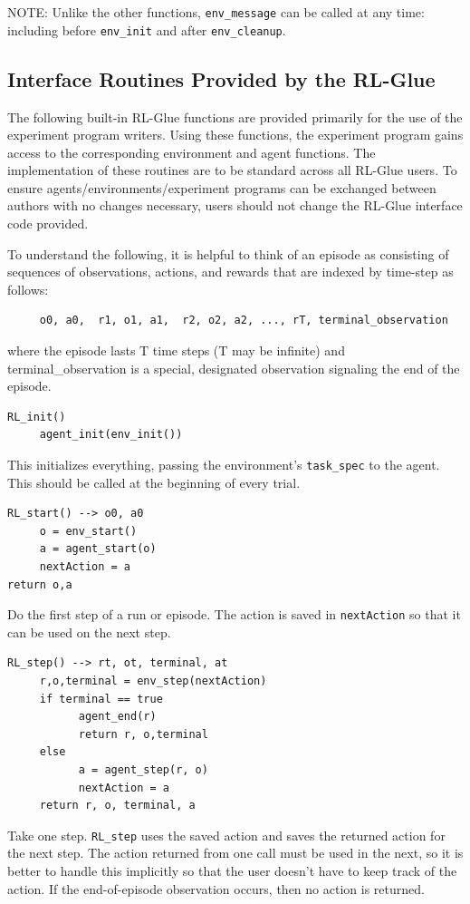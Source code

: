 \documentclass[11pt]{article}
\begin{document}
NOTE: Unlike the other functions, \texttt{env\_message} can be called at any time: including before \texttt{env\_init} and after \texttt{env\_cleanup}.

\subsection{Interface Routines Provided by the RL-Glue}

The following built-in RL-Glue functions are provided primarily for the use of the experiment program writers. Using these functions, the experiment program gains access to the corresponding environment and agent functions. The implementation of these routines are to be standard across all RL-Glue users. To ensure agents/environments/experiment programs can be exchanged between authors with no changes necessary, users should not change the RL-Glue interface code provided.


To understand the following, it is helpful to think of an episode as consisting of sequences of observations, actions, and rewards that are indexed by time-step as follows:
\begin{verbatim}
     o0, a0,  r1, o1, a1,  r2, o2, a2, ..., rT, terminal_observation
\end{verbatim}
where the episode lasts T time steps (T may be infinite) and terminal\_observation is a special, designated observation signaling the end of the episode.

\begin{verbatim}
RL_init()
     agent_init(env_init())
\end{verbatim}
This initializes everything, passing the environment's \texttt{task\_spec} to the agent. This should be called at the beginning of every trial.
\begin{verbatim}
RL_start() --> o0, a0
     o = env_start()
     a = agent_start(o)
     nextAction = a
return o,a
\end{verbatim}

Do the first step of a run or episode.  The action is saved in \texttt{nextAction} so that it can be used on the next step.
\begin{verbatim}
RL_step() --> rt, ot, terminal, at
     r,o,terminal = env_step(nextAction)
     if terminal == true
           agent_end(r)
           return r, o,terminal
     else
           a = agent_step(r, o)
           nextAction = a
     return r, o, terminal, a 
\end{verbatim}
Take one step.  \texttt{RL\_step} uses the saved action and saves the returned action for the next step.  The action returned from one call must be used in the next, so it is better to handle this implicitly so that the user doesn't have to keep track of the action.  If the end-of-episode observation occurs, then no action is returned.
\end{document}
